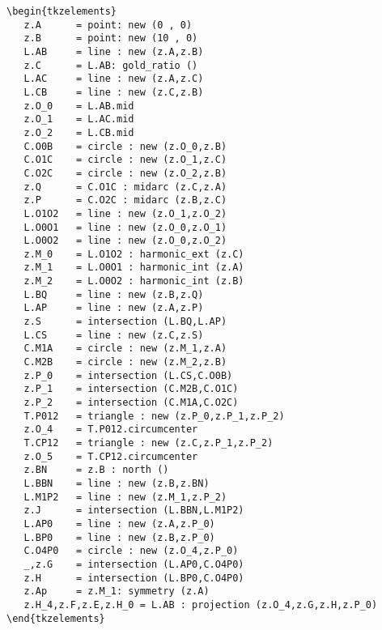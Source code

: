 \begin{Verbatim}
\begin{tkzelements}
   z.A      = point: new (0 , 0)
   z.B      = point: new (10 , 0)
   L.AB     = line : new (z.A,z.B)
   z.C      = L.AB: gold_ratio ()
   L.AC     = line : new (z.A,z.C)
   L.CB     = line : new (z.C,z.B)
   z.O_0    = L.AB.mid
   z.O_1    = L.AC.mid
   z.O_2    = L.CB.mid
   C.O0B    = circle : new (z.O_0,z.B)
   C.O1C    = circle : new (z.O_1,z.C)
   C.O2C    = circle : new (z.O_2,z.B)
   z.Q      = C.O1C : midarc (z.C,z.A)
   z.P      = C.O2C : midarc (z.B,z.C)
   L.O1O2   = line : new (z.O_1,z.O_2)
   L.O0O1   = line : new (z.O_0,z.O_1)
   L.O0O2   = line : new (z.O_0,z.O_2)
   z.M_0    = L.O1O2 : harmonic_ext (z.C)
   z.M_1    = L.O0O1 : harmonic_int (z.A)
   z.M_2    = L.O0O2 : harmonic_int (z.B)
   L.BQ     = line : new (z.B,z.Q)
   L.AP     = line : new (z.A,z.P)
   z.S      = intersection (L.BQ,L.AP)
   L.CS     = line : new (z.C,z.S)
   C.M1A    = circle : new (z.M_1,z.A)
   C.M2B    = circle : new (z.M_2,z.B)
   z.P_0    = intersection (L.CS,C.O0B)
   z.P_1    = intersection (C.M2B,C.O1C)
   z.P_2    = intersection (C.M1A,C.O2C)
   T.P012   = triangle : new (z.P_0,z.P_1,z.P_2)
   z.O_4    = T.P012.circumcenter
   T.CP12   = triangle : new (z.C,z.P_1,z.P_2)
   z.O_5    = T.CP12.circumcenter
   z.BN     = z.B : north ()
   L.BBN    = line : new (z.B,z.BN)
   L.M1P2   = line : new (z.M_1,z.P_2)
   z.J      = intersection (L.BBN,L.M1P2)
   L.AP0    = line : new (z.A,z.P_0)
   L.BP0    = line : new (z.B,z.P_0)
   C.O4P0   = circle : new (z.O_4,z.P_0)
   _,z.G    = intersection (L.AP0,C.O4P0)
   z.H      = intersection (L.BP0,C.O4P0)
   z.Ap     = z.M_1: symmetry (z.A)
   z.H_4,z.F,z.E,z.H_0 = L.AB : projection (z.O_4,z.G,z.H,z.P_0)
\end{tkzelements}
\end{Verbatim}


